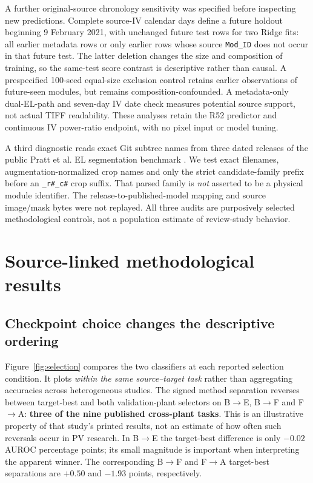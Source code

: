 \documentclass[10pt,a4paper]{article}
\begin{document}
A further original-source chronology sensitivity was specified before inspecting new predictions. Complete source-IV calendar days define a future holdout beginning 9 February 2021, with unchanged future test rows for two Ridge fits: all earlier metadata rows or only earlier rows whose source \texttt{Mod\_ID} does not occur in that future test. The latter deletion changes the size and composition of training, so the same-test score contrast is descriptive rather than causal. A prespecified 100-seed equal-size exclusion control retains earlier observations of future-seen modules, but remains composition-confounded. A metadata-only dual-EL-path and seven-day IV date check measures potential source support, not actual TIFF readability. These analyses retain the R52 predictor and continuous IV power-ratio endpoint, with no pixel input or model tuning.

A third diagnostic reads exact Git subtree names from three dated releases of the public Pratt et al. EL segmentation benchmark \cite{pratt2023}. We test exact filenames, augmentation-normalized crop names and only the strict candidate-family prefix before an \texttt{\_r\#\_c\#} crop suffix. That parsed family is \emph{not} asserted to be a physical module identifier. The release-to-published-model mapping and source image/mask bytes were not replayed. All three audits are purposively selected methodological controls, not a population estimate of review-study behavior.

\section{Source-linked methodological results}
\subsection{Checkpoint choice changes the descriptive ordering}
Figure~\ref{fig:selection} compares the two classifiers at each reported selection condition. It plots \emph{within the same source--target task} rather than aggregating accuracies across heterogeneous studies. The signed method separation reverses between target-best and both validation-plant selectors on B$\rightarrow$E, B$\rightarrow$F and F$\rightarrow$A: \textbf{three of the nine published cross-plant tasks}. This is an illustrative property of that study's printed results, not an estimate of how often such reversals occur in PV research. In B$\rightarrow$E the target-best difference is only $-0.02$ AUROC percentage points; its small magnitude is important when interpreting the apparent winner. The corresponding B$\rightarrow$F and F$\rightarrow$A target-best separations are $+0.50$ and $-1.93$ points, respectively.
\end{document}
